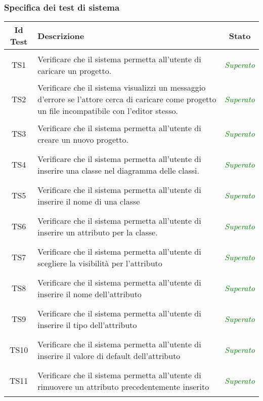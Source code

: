\subsubsection{Specifica dei test di sistema}
\normalsize
\begin{longtable}{|c|>{}m{8cm}|c|}
\hline 
\textbf{Id Test} & \textbf{Descrizione} & \textbf{Stato}\\
\hline
\endhead
\hypertarget{TS1}{TS1} & Verificare che il sistema permetta all'utente di caricare un progetto. & \textcolor{Green}{\textit{Superato}}\\ \hline
\hypertarget{TS2}{TS2} & Verificare che il sistema visualizzi un messaggio d'errore se l'attore cerca di caricare come progetto un file incompatibile con l'editor stesso. & \textcolor{Green}{\textit{Superato}}\\ \hline
\hypertarget{TS3}{TS3} & Verificare che il sistema permetta all'utente di creare un nuovo progetto. & \textcolor{Green}{\textit{Superato}}\\ \hline
\hypertarget{TS4}{TS4} & Verificare che il sistema permetta all'utente di inserire una classe nel diagramma delle classi. & \textcolor{Green}{\textit{Superato}}\\ \hline
\hypertarget{TS5}{TS5} & Verificare che il sistema permetta all'utente di inserire il nome di una classe & \textcolor{Green}{\textit{Superato}}\\ \hline
\hypertarget{TS6}{TS6} & Verificare che il sistema permetta all'utente di inserire un attributo per la classe. & \textcolor{Green}{\textit{Superato}}\\ \hline
\hypertarget{TS7}{TS7} & Verificare che il sistema permetta all'utente di scegliere la visibilità per l'attributo & \textcolor{Green}{\textit{Superato}}\\ \hline
\hypertarget{TS8}{TS8} & Verificare che il sistema permetta all'utente di inserire il nome dell'attributo & \textcolor{Green}{\textit{Superato}}\\ \hline
\hypertarget{TS9}{TS9} & Verificare che il sistema permetta all'utente di inserire il tipo dell'attributo & \textcolor{Green}{\textit{Superato}}\\ \hline
\hypertarget{TS10}{TS10} & Verificare che il sistema permetta all'utente di inserire il valore di default dell'attributo & \textcolor{Green}{\textit{Superato}}\\ \hline
\hypertarget{TS11}{TS11} & Verificare che il sistema permetta all'utente di rimuovere un attributo precedentemente inserito & \textcolor{Green}{\textit{Superato}}\\ \hline

\end{longtable}

